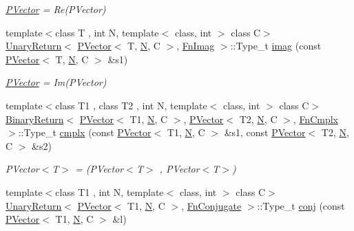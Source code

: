 \begin{DoxyCompactItemize}
\begin{DoxyCompactList}\small\item\em \mbox{\hyperlink{classENSEM_1_1PVector}{P\+Vector}} = Re(\+P\+Vector) \end{DoxyCompactList}\item 
{\footnotesize template$<$class T , int N, template$<$ class, int $>$ class C$>$ }\\\mbox{\hyperlink{structENSEM_1_1UnaryReturn}{Unary\+Return}}$<$ \mbox{\hyperlink{classENSEM_1_1PVector}{P\+Vector}}$<$ T, \mbox{\hyperlink{operator__name__util_8cc_a7722c8ecbb62d99aee7ce68b1752f337}{N}}, C $>$, \mbox{\hyperlink{structENSEM_1_1FnImag}{Fn\+Imag}} $>$\+::Type\+\_\+t \mbox{\hyperlink{group__primvector_ga29974958f6885a4267cae10b6bec2344}{imag}} (const \mbox{\hyperlink{classENSEM_1_1PVector}{P\+Vector}}$<$ T, \mbox{\hyperlink{operator__name__util_8cc_a7722c8ecbb62d99aee7ce68b1752f337}{N}}, C $>$ \&s1)
\begin{DoxyCompactList}\small\item\em \mbox{\hyperlink{classENSEM_1_1PVector}{P\+Vector}} = Im(\+P\+Vector) \end{DoxyCompactList}\item 
{\footnotesize template$<$class T1 , class T2 , int N, template$<$ class, int $>$ class C$>$ }\\\mbox{\hyperlink{structENSEM_1_1BinaryReturn}{Binary\+Return}}$<$ \mbox{\hyperlink{classENSEM_1_1PVector}{P\+Vector}}$<$ T1, \mbox{\hyperlink{operator__name__util_8cc_a7722c8ecbb62d99aee7ce68b1752f337}{N}}, C $>$, \mbox{\hyperlink{classENSEM_1_1PVector}{P\+Vector}}$<$ T2, \mbox{\hyperlink{operator__name__util_8cc_a7722c8ecbb62d99aee7ce68b1752f337}{N}}, C $>$, \mbox{\hyperlink{structENSEM_1_1FnCmplx}{Fn\+Cmplx}} $>$\+::Type\+\_\+t \mbox{\hyperlink{group__primvector_ga4b7fc81e0d4329f6c328adee1c9daf7e}{cmplx}} (const \mbox{\hyperlink{classENSEM_1_1PVector}{P\+Vector}}$<$ T1, \mbox{\hyperlink{operator__name__util_8cc_a7722c8ecbb62d99aee7ce68b1752f337}{N}}, C $>$ \&s1, const \mbox{\hyperlink{classENSEM_1_1PVector}{P\+Vector}}$<$ T2, \mbox{\hyperlink{operator__name__util_8cc_a7722c8ecbb62d99aee7ce68b1752f337}{N}}, C $>$ \&s2)
\begin{DoxyCompactList}\small\item\em P\+Vector$<$\+T$>$ = (P\+Vector$<$\+T$>$ , P\+Vector$<$\+T$>$) \end{DoxyCompactList}\item 
{\footnotesize template$<$class T1 , int N, template$<$ class, int $>$ class C$>$ }\\\mbox{\hyperlink{structENSEM_1_1UnaryReturn}{Unary\+Return}}$<$ \mbox{\hyperlink{classENSEM_1_1PVector}{P\+Vector}}$<$ T1, \mbox{\hyperlink{operator__name__util_8cc_a7722c8ecbb62d99aee7ce68b1752f337}{N}}, C $>$, \mbox{\hyperlink{structENSEM_1_1FnConjugate}{Fn\+Conjugate}} $>$\+::Type\+\_\+t \mbox{\hyperlink{group__primvector_gaf0e85ba33a2d6040ed1d0e3869ae7818}{conj}} (const \mbox{\hyperlink{classENSEM_1_1PVector}{P\+Vector}}$<$ T1, \mbox{\hyperlink{operator__name__util_8cc_a7722c8ecbb62d99aee7ce68b1752f337}{N}}, C $>$ \&l)

\end{DoxyCompactItemize}
